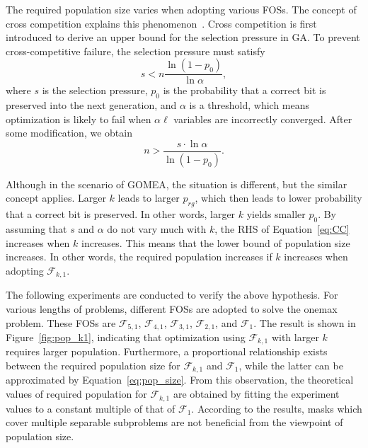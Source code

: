 \documentclass{sig-alternate}
\begin{document}
The required population size varies when adopting various FOSs.
The concept of cross competition explains this phenomenon~\cite{1992_CC}.
Cross competition is first introduced to derive an upper bound for the selection pressure in GA.
To prevent cross-competitive failure, the selection pressure must satisfy
\begin{equation*}
s<n\frac{\ln\left(1-p_0\right)}{\ln \alpha},
\end{equation*}
where $s$ is the selection pressure, $p_0$ is the probability that a correct bit is preserved into the next generation,
and $\alpha$ is a threshold, which means optimization is likely to fail when $\alpha\ell$ variables are incorrectly converged.
After some modification, we obtain
\begin{equation}\label{eq:CC}
n>\frac{s\cdot \ln \alpha}{\ln\left(1-p_0\right)}.
\end{equation}

Although in the scenario of GOMEA, the situation is different, but the similar concept applies.
Larger $k$ leads to larger $p_{rg}$,
which then leads to lower probability that a correct bit is preserved.
In other words, larger $k$ yields smaller $p_0$.
By assuming that $s$ and $\alpha$ do not vary much with $k$,
the RHS of Equation~\ref{eq:CC} increases when $k$ increases.
This means that the lower bound of population size increases.
In other words, the required population increases if $k$ increases when adopting ${\mathcal F}_{k,1}$.

The following experiments are conducted to verify the above hypothesis.
For various lengths of problems, different FOSs are adopted to solve the onemax problem.
These FOSs are ${\mathcal F}_{5,1}$, ${\mathcal F}_{4,1}$, ${\mathcal F}_{3,1}$, ${\mathcal F}_{2,1}$, and ${\mathcal F}_1$.
The result is shown in Figure~\ref{fig:pop_k1},
indicating that optimization using ${\mathcal F}_{k,1}$ with larger $k$ requires larger population.
Furthermore,
a proportional relationship exists between the required population size for ${\mathcal F}_{k,1}$ and ${\mathcal F}_1$,
while the latter can be approximated by Equation~\ref{eq:pop_size}.
From this observation,
the theoretical values of required population for ${\mathcal F}_{k,1}$ are obtained by fitting the experiment values to a constant multiple of that of ${\mathcal F}_1$.
According to the results, masks which cover multiple separable subproblems are not beneficial from the viewpoint of population size.
\end{document}
